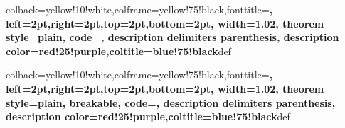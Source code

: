 %
{colback=yellow!10!white,colframe=yellow!75!black,fonttitle=\bfseries,
left=2pt,right=2pt,top=2pt,bottom=2pt,
width=1.02\linewidth,
theorem style=plain,
code={\onehalfspacing},
description delimiters parenthesis, description color=red!25!purple,coltitle=blue!75!black}{def}

%
{colback=yellow!10!white,colframe=yellow!75!black,fonttitle=\bfseries,
left=2pt,right=2pt,top=2pt,bottom=2pt,
width=1.02\linewidth,
theorem style=plain,
breakable,
code={\onehalfspacing},
description delimiters parenthesis, description color=red!25!purple,coltitle=blue!75!black}{def}





